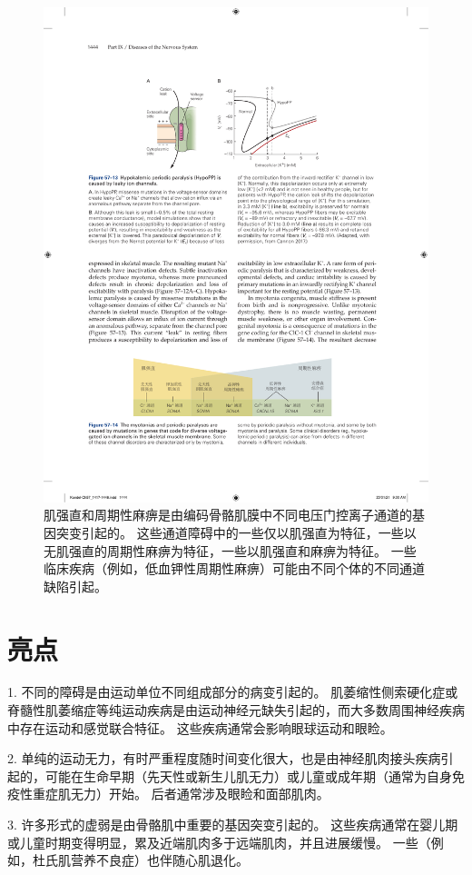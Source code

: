 \begin{figure}[htbp]
	\centering
	\includegraphics[width=0.85\linewidth]{chap57/fig_57_14}
	\caption{肌强直和周期性麻痹是由编码骨骼肌膜中不同电压门控离子通道的基因突变引起的。
		这些通道障碍中的一些仅以肌强直为特征，一些以无肌强直的周期性麻痹为特征，一些以肌强直和麻痹为特征。
		一些临床疾病（例如，低血钾性周期性麻痹）可能由不同个体的不同通道缺陷引起。}
	\label{fig:57_14}
\end{figure}



\section{亮点}

1. 不同的障碍是由运动单位不同组成部分的病变引起的。
肌萎缩性侧索硬化症或脊髓性肌萎缩症等纯运动疾病是由运动神经元缺失引起的，而大多数周围神经疾病中存在运动和感觉联合特征。
这些疾病通常会影响眼球运动和眼睑。


2. 单纯的运动无力，有时严重程度随时间变化很大，也是由神经肌肉接头疾病引起的，可能在生命早期（先天性或新生儿肌无力）或儿童或成年期（通常为自身免疫性重症肌无力）开始。
后者通常涉及眼睑和面部肌肉。


3. 许多形式的虚弱是由骨骼肌中重要的基因突变引起的。
这些疾病通常在婴儿期或儿童时期变得明显，累及近端肌肉多于远端肌肉，并且进展缓慢。
一些（例如，杜氏肌营养不良症）也伴随心肌退化。


